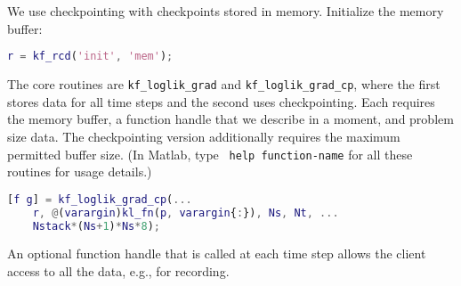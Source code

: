 \documentclass[10pt,fleqn]{article}
\begin{document}
We use checkpointing with checkpoints stored in memory. Initialize the memory
buffer:
\begin{lstlisting}[language=matlab,basicstyle=\footnotesize]
r = kf_rcd('init', 'mem');
\end{lstlisting}
The core routines are {\tt kf\_loglik\_grad} and {\tt kf\_loglik\_grad\_cp},
where the first stores data for all time steps and the second uses
checkpointing. Each requires the memory buffer, a function handle that we
describe in a moment, and problem size data. The checkpointing version
additionally requires the maximum permitted buffer size. (In Matlab, type {\tt
  help function-name} for all these routines for usage details.)
\begin{lstlisting}[language=matlab,basicstyle=\footnotesize]
[f g] = kf_loglik_grad_cp(...
    r, @(varargin)kl_fn(p, varargin{:}), Ns, Nt, ...
    Nstack*(Ns+1)*Ns*8);
\end{lstlisting}
An optional function handle that is called at each time step allows the client
access to all the data, e.g., for recording.
\end{document}

